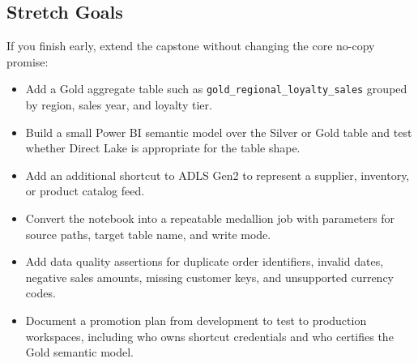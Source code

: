 \subsection*{Stretch Goals}
If you finish early, extend the capstone without changing the core no-copy promise:
\begin{itemize}
    \item Add a Gold aggregate table such as \texttt{gold\_regional\_loyalty\_sales} grouped by region, sales year, and loyalty tier.
    \item Build a small Power BI semantic model over the Silver or Gold table and test whether Direct Lake is appropriate for the table shape.
    \item Add an additional shortcut to ADLS Gen2 to represent a supplier, inventory, or product catalog feed.
    \item Convert the notebook into a repeatable medallion job with parameters for source paths, target table name, and write mode.
    \item Add data quality assertions for duplicate order identifiers, invalid dates, negative sales amounts, missing customer keys, and unsupported currency codes.
    \item Document a promotion plan from development to test to production workspaces, including who owns shortcut credentials and who certifies the Gold semantic model.
\end{itemize}
